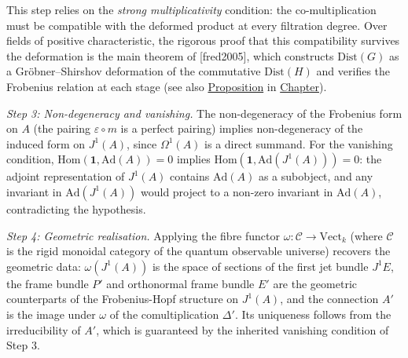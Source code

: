 \begin{proposition}
This step relies on the \emph{strong multiplicativity} condition: the
co-multiplication must be compatible with the deformed product at every
filtration degree.  Over fields of positive characteristic, the
rigorous proof that this compatibility survives the deformation is the
main theorem of [fred2005], which constructs $\mathrm{Dist}(G)$
as a Gröbner--Shirshov deformation of the commutative
$\mathrm{Dist}(H)$ and verifies the Frobenius relation at each stage
(see also \hyperref[prop:skew-poisson-integration]{Proposition} in
\hyperref[chap:p-adic]{Chapter}).

\emph{Step 3: Non-degeneracy and vanishing.}
The non-degeneracy of the Frobenius form on $A$ (the pairing
$\varepsilon \circ m$ is a perfect pairing) implies non-degeneracy of the
induced form on $J^1(A)$, since $\Omega^1(A)$ is a direct summand.
For the vanishing condition, $\mathrm{Hom}(\mathbf{1}, \mathrm{Ad}(A)) = 0$
implies $\mathrm{Hom}(\mathbf{1}, \mathrm{Ad}(J^1(A))) = 0$: the adjoint
representation of $J^1(A)$ contains $\mathrm{Ad}(A)$ as a subobject, and any
invariant in $\mathrm{Ad}(J^1(A))$ would project to a non-zero invariant in
$\mathrm{Ad}(A)$, contradicting the hypothesis.

\emph{Step 4: Geometric realisation.}
Applying the fibre functor $\omega\colon \mathcal{C} \to \mathrm{Vect}_k$
(where $\mathcal{C}$ is the rigid monoidal category of the quantum
observable universe)
recovers the geometric data: $\omega(J^1(A))$ is the space of sections of the
first jet bundle $J^1 E$, the frame bundle $P'$ and orthonormal frame bundle
$E'$ are the geometric counterparts of the Frobenius-Hopf structure on
$J^1(A)$, and the connection $A'$ is the image under $\omega$ of the
comultiplication $\Delta'$.  Its uniqueness follows from the irreducibility
of $A'$, which is guaranteed by the inherited vanishing condition of
Step 3.
\end{proposition}
